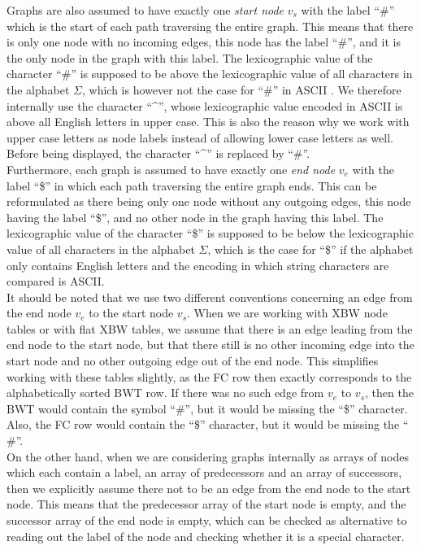 \documentclass[a4paper,12pt,twoside,BCOR=10mm]{scrbook}
\begin{document}
Graphs are also assumed to have exactly one \textit{start node}\label{def:start_node} $ v_s $ with the label “$\#$” which
is the start of each path traversing the entire graph. This means that there is only one node with no incoming
edges, this node has the label “$\#$”, and it is the only node in the graph with this label.
The lexicographic value of the character “$\#$” is supposed to be above the
lexicographic value of all characters in the alphabet $ \Sigma $,
which is however not the case for “$\#$” in ASCII \citep{ASCII}.
We therefore internally use the character “{\textasciicircum}”, whose lexicographic value encoded in ASCII
is above all English letters in upper case.\label{hat_instead_of_hashtag}
This is also the reason why we work with upper case letters as node labels instead of allowing lower case letters as well.
Before being displayed, the character “{\textasciicircum}” is replaced by “$\#$”. \\
Furthermore, each graph is assumed to have exactly one \textit{end node}\label{def:end_node} $ v_e $ with the label “\$” in which
each path traversing the entire graph ends. This can be reformulated as there being only one node without any
outgoing edges, this node having the label “\$”, and no other node in the graph having this label.
The lexicographic value of the character “\$” is supposed to be below the
lexicographic value of all characters in the alphabet $ \Sigma $,
which is the case for “\$” if the alphabet only contains English letters and the encoding in
which string characters are compared is ASCII. \\
It should be noted that we use two different conventions concerning
an edge from the end node $ v_e $ to the start node $ v_s $.
When we are working with XBW node tables or with flat XBW tables,
we assume that there is an edge leading from the end node to the start node,
but that there still is no other incoming edge into the start node and no other outgoing edge out of the end node.
This simplifies working with these tables slightly, as the FC row then exactly corresponds
to the alphabetically sorted BWT row.
If there was no such edge from $ v_e $ to $ v_s $,
then the BWT would contain the symbol “$\#$”, but it would be missing the “\$” character.
Also, the FC row would contain the “\$” character, but it would be missing the “$\#$”. \\
On the other hand, when we are considering graphs internally as arrays of nodes which
each contain a label, an array of predecessors and an array of successors,
then we explicitly assume there not to be an edge from the end node to the start node.
This means that the predecessor array of the start node is empty,
and the successor array of the end node is empty,
which can be checked as alternative to reading out the label of the node and checking
whether it is a special character.
\end{document}
